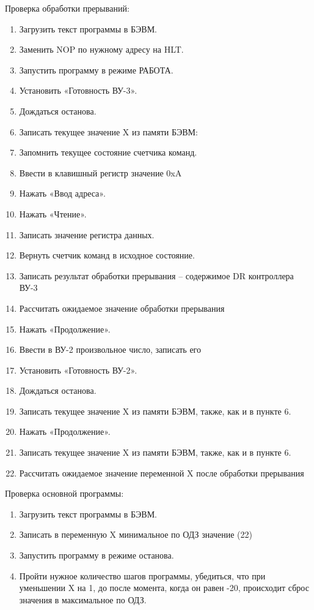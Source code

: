 \documentclass{article}
\begin{document}
Проверка обработки прерываний:
\begin{enumerate}
  \item  Загрузить текст программы в БЭВМ.
  \item  Заменить NOP по нужному адресу на HLT.
  \item  Запустить программу в режиме РАБОТА.
  \item  Установить «Готовность ВУ-3».
  \item  Дождаться останова.
  \item  Записать текущее значение X из памяти БЭВМ:
  \item  Запомнить текущее состояние счетчика команд.
  \item  Ввести в клавишный регистр значение 0xA
  \item  Нажать «Ввод адреса».
  \item  Нажать «Чтение».
  \item  Записать значение регистра данных.
  \item  Вернуть счетчик команд в исходное состояние.
  \item  Записать результат обработки прерывания – содержимое DR контроллера ВУ-3
  \item  Рассчитать ожидаемое значение обработки прерывания
  \item  Нажать «Продолжение».
  \item  Ввести в ВУ-2 произвольное число, записать его
  \item  Установить «Готовность ВУ-2».
  \item  Дождаться останова.
  \item  Записать текущее значение X из памяти БЭВМ, также, как и в пункте 6.
  \item  Нажать «Продолжение».
  \item  Записать текущее значение X из памяти БЭВМ, также, как и в пункте 6.
  \item  Рассчитать ожидаемое значение переменной X после обработки прерывания
\end{enumerate}

Проверка основной программы:
\begin{enumerate}

  \item  Загрузить текст программы в БЭВМ.
  \item  Записать в переменную X минимальное по ОДЗ значение (22)
  \item  Запустить программу в режиме останова.
  \item  Пройти нужное количество шагов программы, убедиться, что при уменьшении X на 1, до после момента, когда он равен -20, происходит сброс значения в максимальное по ОДЗ.
\end{enumerate}
\end{document}

